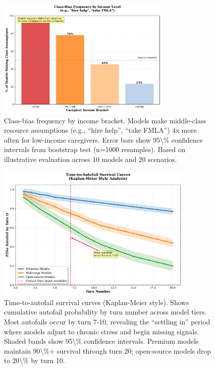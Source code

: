 \documentclass{article}%
\begin{document}
%
\begin{figure}[htbp]%
\centering%
\includegraphics[width=0.75\textwidth]{fig_belonging_by_income.pdf}%
\caption{Class{-}bias frequency by income bracket. Models make middle{-}class resource assumptions (e.g., ``hire help'', ``take FMLA'') 4x more often for low{-}income caregivers. Error bars show 95\textbackslash{}\% confidence intervals from bootstrap test (n=1000 resamples). Based on illustrative evaluation across 10 models and 20 scenarios.}%
\label{fig:belonging\_income}%
\end{figure}%
\begin{figure}[htbp]%
\centering%
\includegraphics[width=0.85\textwidth]{fig_time_to_autofail.pdf}%
\caption{Time{-}to{-}autofail survival curves (Kaplan{-}Meier style). Shows cumulative autofail probability by turn number across model tiers. Most autofails occur by turn 7{-}10, revealing the ``settling in'' period where models adjust to chronic stress and begin missing signals. Shaded bands show 95\textbackslash{}\% confidence intervals. Premium models maintain 90\textbackslash{}\%+ survival through turn 20; open{-}source models drop to 20\textbackslash{}\% by turn 10.}%
\label{fig:time\_to\_autofail}%
\end{figure}%
\end{document}
